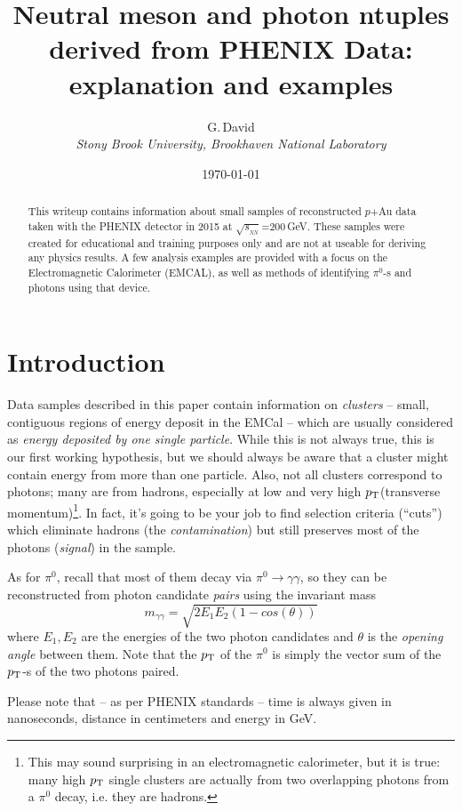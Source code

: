\documentclass[pdftex,12pt,letter]{article}
\title{Neutral meson and photon ntuples derived from PHENIX Data: explanation and examples}
\date{\today}
\author{G.\,David\\
{ \it Stony Brook University, Brookhaven National Laboratory}}
\newcommand{\sqsn}{\mbox{$\sqrt{s_{_{NN}}}$}\xspace}
\newcommand{\piz}{\mbox{$\pi^0$}\xspace}
\newcommand{\pt}{\mbox{$p_{\rm T}$}\xspace}
\begin{document}
\maketitle

\begin{abstract}
\noindent  This writeup contains information about small samples of reconstructed $p$+Au
data taken with the PHENIX detector in 2015 at \sqsn=200\,GeV. These samples were created
for educational and training purposes only and are not at useable for deriving any physics
results. A few analysis examples are provided with a focus on the Electromagnetic Calorimeter (EMCAL),
as well as methods of identifying $\pi^0$-s and photons using that device.
\end{abstract}


\section{Introduction}
Data samples described in this paper contain
information on {\it clusters} -- small, contiguous regions of energy
deposit in the EMCal -- which are usually considered as 
{\it energy deposited by one single particle}.  While this is not
always true, this is our first working hypothesis, but we should
always be aware that a cluster might contain energy from more than one
particle.  Also, not all
clusters correspond to photons; many are from hadrons, especially at
low and very high \pt (transverse momentum)\footnote{This may sound
  surprising in an electromagnetic calorimeter, but it is true: many
  high \pt single clusters are actually from two overlapping photons
  from a \piz decay, i.e. they are hadrons.
}.  
In fact, it's going to
be your job to find selection criteria (``cuts'') which eliminate
hadrons (the {\it contamination}) but still preserves most of the
photons ({\it signal}) in the sample.

As for \piz, recall that most of them decay via 
$\pi^0 \rightarrow \gamma\gamma$, so they can be reconstructed from
photon candidate {\it pairs} using the invariant mass
$$ m_{\gamma\gamma} = \sqrt{2E_1E_2(1-cos(\theta))} $$
where $E_1,E_2$ are the energies of the two photon candidates and
$\theta$ is the {\it opening angle} between them.  Note that the \pt
of the \piz is simply the vector sum of the \pt-s of the two photons
paired. 

Please note that -- as per PHENIX standards -- time is always given in
nanoseconds, distance in centimeters and energy in GeV.
\end{document}
